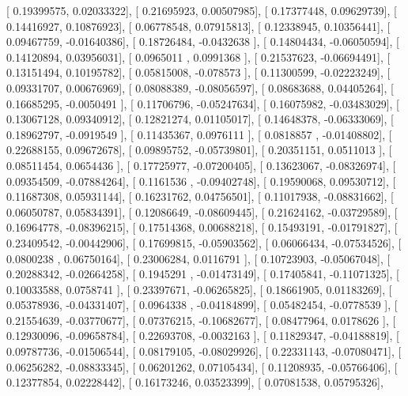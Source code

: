 \documentclass{article}
\begin{document}
       [ 0.19399575,  0.02033322],
       [ 0.21695923,  0.00507985],
       [ 0.17377448,  0.09629739],
       [ 0.14416927,  0.10876923],
       [ 0.06778548,  0.07915813],
       [ 0.12338945,  0.10356441],
       [ 0.09467759, -0.01640386],
       [ 0.18726484, -0.0432638 ],
       [ 0.14804434, -0.06050594],
       [ 0.14120894,  0.03956031],
       [ 0.0965011 ,  0.0991368 ],
       [ 0.21537623, -0.06694491],
       [ 0.13151494,  0.10195782],
       [ 0.05815008, -0.078573  ],
       [ 0.11300599, -0.02223249],
       [ 0.09331707,  0.00676969],
       [ 0.08088389, -0.08056597],
       [ 0.08683688,  0.04405264],
       [ 0.16685295, -0.0050491 ],
       [ 0.11706796, -0.05247634],
       [ 0.16075982, -0.03483029],
       [ 0.13067128,  0.09340912],
       [ 0.12821274,  0.01105017],
       [ 0.14648378, -0.06333069],
       [ 0.18962797, -0.0919549 ],
       [ 0.11435367,  0.0976111 ],
       [ 0.0818857 , -0.01408802],
       [ 0.22688155,  0.09672678],
       [ 0.09895752, -0.05739801],
       [ 0.20351151,  0.0511013 ],
       [ 0.08511454,  0.0654436 ],
       [ 0.17725977, -0.07200405],
       [ 0.13623067, -0.08326974],
       [ 0.09354509, -0.07884264],
       [ 0.1161536 , -0.09402748],
       [ 0.19590068,  0.09530712],
       [ 0.11687308,  0.05931144],
       [ 0.16231762,  0.04756501],
       [ 0.11017938, -0.08831662],
       [ 0.06050787,  0.05834391],
       [ 0.12086649, -0.08609445],
       [ 0.21624162, -0.03729589],
       [ 0.16964778, -0.08396215],
       [ 0.17514368,  0.00688218],
       [ 0.15493191, -0.01791827],
       [ 0.23409542, -0.00442906],
       [ 0.17699815, -0.05903562],
       [ 0.06066434, -0.07534526],
       [ 0.0800238 ,  0.06750164],
       [ 0.23006284,  0.0116791 ],
       [ 0.10723903, -0.05067048],
       [ 0.20288342, -0.02664258],
       [ 0.1945291 , -0.01473149],
       [ 0.17405841, -0.11071325],
       [ 0.10033588,  0.0758741 ],
       [ 0.23397671, -0.06265825],
       [ 0.18661905,  0.01183269],
       [ 0.05378936, -0.04331407],
       [ 0.0964338 , -0.04184899],
       [ 0.05482454, -0.0778539 ],
       [ 0.21554639, -0.03770677],
       [ 0.07376215, -0.10682677],
       [ 0.08477964,  0.0178626 ],
       [ 0.12930096, -0.09658784],
       [ 0.22693708, -0.0032163 ],
       [ 0.11829347, -0.04188819],
       [ 0.09787736, -0.01506544],
       [ 0.08179105, -0.08029926],
       [ 0.22331143, -0.07080471],
       [ 0.06256282, -0.08833345],
       [ 0.06201262,  0.07105434],
       [ 0.11208935, -0.05766406],
       [ 0.12377854,  0.02228442],
       [ 0.16173246,  0.03523399],
       [ 0.07081538,  0.05795326],
\end{document}
